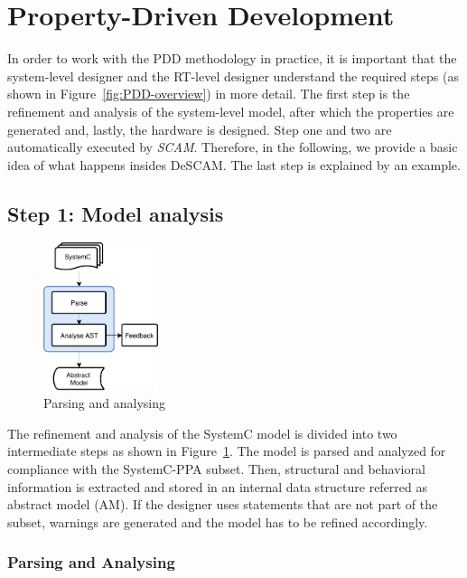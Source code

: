 \section{Property-Driven Development}
\label{sec:pdd}

In order to work with the PDD methodology in practice, it is important that the system-level designer and the RT-level designer understand the required steps (as shown in Figure~\ref{fig:PDD-overview}) in more detail.
The first step is the refinement and analysis of the system-level model, after which the properties are generated and, lastly, the hardware is designed.
Step one and two are automatically executed by \textit{SCAM}. 
Therefore, in the following, we provide a basic idea of what happens insides DeSCAM. 
The last step is explained by an example.

\subsection{Step 1: Model analysis}
\label{sec:model-analysis}

\begin{figure}
	\vspace{-20pt}
    \caption{Parsing and analysing}
    \label{fig:step1-detail}
    \includegraphics[width=0.3\textwidth]{fig/step1_detail}
    \vspace{-40pt}
\end{figure}

The refinement and analysis of the SystemC model is divided into two intermediate steps as shown in Figure~\ref{fig:step1-detail}.
The model is parsed and analyzed for compliance with the SystemC-PPA subset.
Then, structural and behavioral information is extracted and stored in an internal data structure referred as abstract model (AM).
If the designer uses statements that are not part of the subset, warnings are generated and the model has to be refined accordingly. 

\subsubsection{Parsing and Analysing}

